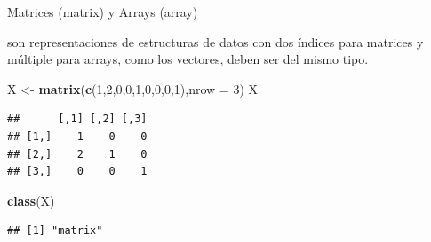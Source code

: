 \documentclass[ignorenonframetext,]{beamer}
\newenvironment{Shaded}{\begin{snugshade}}{\end{snugshade}}
\newcommand{\KeywordTok}[1]{\textcolor[rgb]{0.13,0.29,0.53}{\textbf{#1}}}
\newcommand{\DataTypeTok}[1]{\textcolor[rgb]{0.13,0.29,0.53}{#1}}
\newcommand{\DecValTok}[1]{\textcolor[rgb]{0.00,0.00,0.81}{#1}}
\newcommand{\StringTok}[1]{\textcolor[rgb]{0.31,0.60,0.02}{#1}}
\newcommand{\NormalTok}[1]{#1}
\begin{document}
\begin{frame}[fragile]{Matrices (matrix) y Arrays (array)}

son representaciones de estructuras de datos con dos índices para
matrices y múltiple para arrays, como los vectores, deben ser del mismo
tipo.

\begin{Shaded}
\begin{Highlighting}[]
\NormalTok{X <-}\StringTok{ }\KeywordTok{matrix}\NormalTok{(}\KeywordTok{c}\NormalTok{(}\DecValTok{1}\NormalTok{,}\DecValTok{2}\NormalTok{,}\DecValTok{0}\NormalTok{,}\DecValTok{0}\NormalTok{,}\DecValTok{1}\NormalTok{,}\DecValTok{0}\NormalTok{,}\DecValTok{0}\NormalTok{,}\DecValTok{0}\NormalTok{,}\DecValTok{1}\NormalTok{),}\DataTypeTok{nrow =} \DecValTok{3}\NormalTok{)}
\NormalTok{X}
\end{Highlighting}
\end{Shaded}

\begin{verbatim}
##      [,1] [,2] [,3]
## [1,]    1    0    0
## [2,]    2    1    0
## [3,]    0    0    1
\end{verbatim}

\begin{Shaded}
\begin{Highlighting}[]
\KeywordTok{class}\NormalTok{(X)}
\end{Highlighting}
\end{Shaded}

\begin{verbatim}
## [1] "matrix"
\end{verbatim}

\end{frame}
\end{document}
